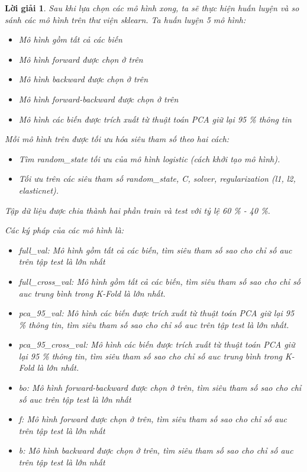 \documentclass[14pt, a4paper]{article}
\theoremstyle{sltheorem}
\theoremstyle{soltheorem}
\newtheorem*{loigiai}{Lời giải}
\begin{document}
\begin{loigiai}
    Sau khi lựa chọn các mô hình xong, ta sẽ thực hiện huấn luyện và so sánh các mô hình trên thư viện sklearn.
    Ta huấn luyện 5 mô hình:

    \begin{itemize}
        \item Mô hình gồm tất cả các biến
        \item Mô hình forward được chọn ở trên
        \item Mô hình backward được chọn ở trên
        \item Mô hình forward-backward được chọn ở trên
        \item Mô hình các biến được trích xuất từ thuật toán PCA giữ lại 95 \% thông tin
    \end{itemize}

    Mỗi mô hình trên được tối ưu hóa siêu tham số theo hai cách:

    \begin{itemize}
        \item Tìm random\_state tối ưu của mô hình logistic (cách khởi tạo mô hình).
        \item Tối ưu trên các siêu tham số random\_state, C, solver, regularization (l1, l2, elasticnet).
    \end{itemize}

    Tập dữ liệu được chia thành hai phần train và test với tỷ lệ 60 \% - 40 \%.
    
    Các ký pháp của các mô hình là:

    \begin{itemize}
        \item full\_val: Mô hình gồm tất cả các biến, tìm siêu tham số sao cho chỉ số auc trên tập test là lớn nhất
        \item full\_cross\_val: Mô hình gồm tất cả các biến, tìm siêu tham số sao cho chỉ số auc trung bình trong K-Fold là lớn nhất.
        \item pca\_95\_val: Mô hình các biến được trích xuất từ thuật toán PCA giữ lại 95 \% thông tin, tìm siêu tham số sao cho chỉ số auc trên tập test là lớn nhất.
        \item pca\_95\_cross\_val: Mô hình các biến được trích xuất từ thuật toán PCA giữ lại 95 \% thông tin, tìm siêu tham số sao cho chỉ số auc trung bình trong K-Fold là lớn nhất.
        \item bo: Mô hình forward-backward được chọn ở trên, tìm siêu tham số sao cho chỉ số auc trên tập test là lớn nhất
        \item f: Mô hình forward được chọn ở trên, tìm siêu tham số sao cho chỉ số auc trên tập test là lớn nhất
        \item b: Mô hình backward được chọn ở trên, tìm siêu tham số sao cho chỉ số auc trên tập test là lớn nhất
    \end{itemize}


\end{loigiai}
\end{document}
